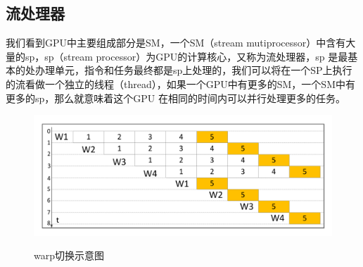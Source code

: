 \subsection {流处理器}
我们看到GPU中主要组成部分是SM，一个SM（stream mutiprocessor）中含有大量的sp，sp（stream processor）为GPU的计算核心，又称为流处理器，sp 是最基本的处办理单元，指令和任务最终都是sp上处理的，我们可以将在一个SP上执行的流看做一个独立的线程（thread），如果一个GPU中有更多的SM，一个SM中有更多的sp，那么就意味着这个GPU 在相同的时间内可以并行处理更多的任务。
\begin{figure}
\setlength{\belowcaptionskip}{-0.5cm}
  \begin{center}
    {\includegraphics[width=1 \textwidth]{figures/warpsketch.pdf}}
    \end{center}
  \caption{{\footnotesize{warp切换示意图}}}
  \label{wps}
\end{figure}
